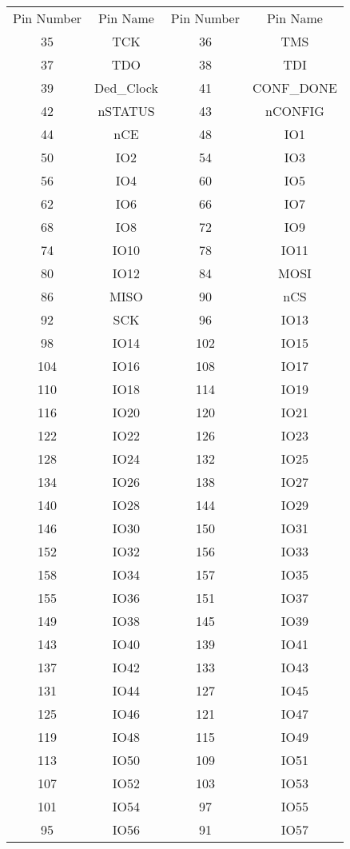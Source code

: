 
\begin{table}[h]
\centering
\begin{tabular}{|c|c||c|c|}
Pin Number & Pin Name & Pin Number & Pin Name \\
35 & TCK & 36 & TMS \\
37 & TDO & 38 & TDI \\
39 & Ded\_Clock & 41 & CONF\_DONE \\
42 & nSTATUS & 43 & nCONFIG \\
44 & nCE & 48 & IO1 \\
50 & IO2 & 54 & IO3 \\
56 & IO4 & 60 & IO5 \\
62 & IO6 & 66 & IO7 \\
68 & IO8 & 72 & IO9 \\
74 & IO10 & 78 & IO11 \\
80 & IO12 & 84 & MOSI \\
86 & MISO & 90 & nCS \\
92 & SCK & 96 & IO13 \\
98 & IO14 & 102 & IO15 \\
104 & IO16 & 108 & IO17 \\
110 & IO18 & 114 & IO19 \\
116 & IO20 & 120 & IO21 \\
122 & IO22 & 126 & IO23 \\
128 & IO24 & 132 & IO25 \\
134 & IO26 & 138 & IO27 \\
140 & IO28 & 144 & IO29 \\
146 & IO30 & 150 & IO31 \\
152 & IO32 & 156 & IO33 \\
158 & IO34 & 157 & IO35 \\
155 & IO36 & 151 & IO37 \\
149 & IO38 & 145 & IO39 \\
143 & IO40 & 139 & IO41 \\
137 & IO42 & 133 & IO43 \\
131 & IO44 & 127 & IO45 \\
125 & IO46 & 121 & IO47 \\
119 & IO48 & 115 & IO49 \\
113 & IO50 & 109 & IO51 \\
107 & IO52 & 103 & IO53 \\
101 & IO54 & 97 & IO55 \\
95 & IO56 & 91 & IO57 \\

\end{tabular}
\end{table}
